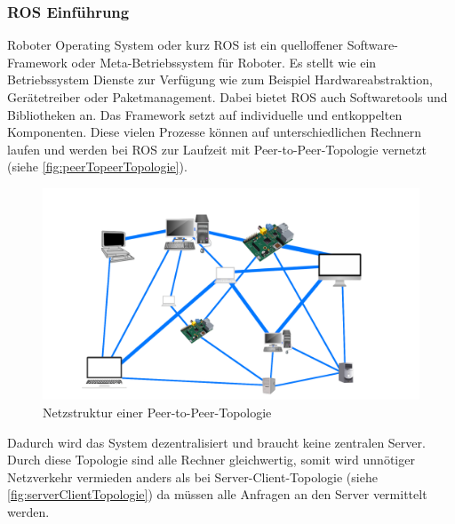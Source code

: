 \subsubsection{ROS Einführung}
Roboter Operating System oder kurz ROS ist ein quelloffener Software-Framework oder Meta-Betriebssystem für Roboter. Es stellt wie ein Betriebssystem Dienste zur Verfügung wie zum Beispiel Hardwareabstraktion, Gerätetreiber oder Paketmanagement. Dabei bietet ROS auch Softwaretools und Bibliotheken an. Das Framework setzt auf individuelle und entkoppelten Komponenten. \cite{ROSIntro.2021} Diese vielen Prozesse können auf unterschiedlichen Rechnern laufen und werden bei ROS zur Laufzeit mit Peer-to-Peer-Topologie vernetzt (siehe \autoref{fig:peerTopeerTopologie}).
\begin{figure}[H]
 \centering
 \includegraphics[width=0.7\linewidth]{Bilder/Grundlagen/peerTopeerTopologie.png}
 \caption{Netzstruktur einer Peer-to-Peer-Topologie}
 \label{fig:peerTopeerTopologie}
\end{figure}
Dadurch wird das System dezentralisiert und braucht keine zentralen Server. Durch diese Topologie sind alle Rechner gleichwertig, somit wird unnötiger Netzverkehr vermieden anders als bei Server-Client-Topologie (siehe \autoref{fig:serverClientTopologie}) da müssen alle Anfragen an den Server vermittelt werden. 

